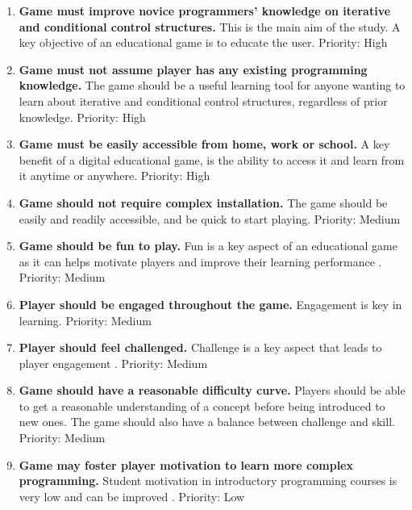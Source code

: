 \documentclass[a4paper,11.5pt]{report}
\numberwithin{figure}{section}
\numberwithin{table}{section}
\numberwithin{equation}{section}
\numberwithin{equation}{section}
\begin{document}
\begin{enumerate}[label=3.1.\arabic*]

  \item \textbf{Game must improve novice programmers' knowledge on iterative and conditional control structures.} This is the main aim of the study. A key objective of an educational game is to educate the user. \newline Priority: High
  
  \item \textbf{Game must not assume player has any existing programming knowledge.} The game should be a useful learning tool for anyone wanting to learn about iterative and conditional control structures, regardless of prior knowledge. \newline Priority: High

  \item \textbf{Game must be easily accessible from home, work or school.} A key benefit of a digital educational game, is the ability to access it and learn from it anytime or anywhere. \newline Priority: High
  
  \item \textbf{Game should not require complex installation.} The game should be easily and readily accessible, and be quick to start playing. \newline Priority: Medium
  
  \item \textbf{Game should be fun to play.} Fun is a key aspect of an educational game as it can helps motivate players \citep{Cordova1996} and improve their learning performance \citep{giannakos2013}. \newline Priority: Medium
  
    \item \textbf{Player should be engaged throughout the game.} Engagement is key in learning. \newline Priority: Medium
  
    \item \textbf{Player should feel challenged.} Challenge is a key aspect that leads to player engagement \citep{whitton2011}. \newline Priority: Medium
  
  \item \textbf{Game should have a reasonable difficulty curve.} Players should be able to get a reasonable understanding of a concept before being introduced to new ones. The game should also have a balance between challenge and skill. \newline Priority: Medium
  
  \item \textbf{Game may foster player motivation to learn more complex programming.} Student motivation in introductory programming courses is very low and can be improved \citep{Koulouri2014}. \newline Priority: Low
  
\end{enumerate}
\end{document}
